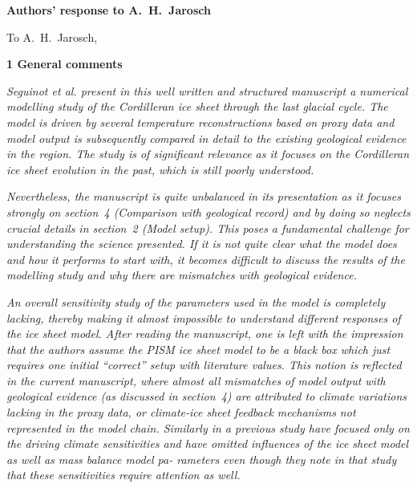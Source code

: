 \documentclass[10pt]{article}
\begin{document}
\textbf{Authors' response to A.~H.~Jarosch}
\bigskip


\newcommand{\doi}[1]{doi:\allowbreak\href{http://dx.doi.org/#1}{#1}}
\newcommand{\sechead}[1]{\bigskip\noindent\textbf{#1}}
\newcommand{\referee}[1]{\bigskip\textcolor{journalname}{\textit{#1}}}
\newcommand{\msquote}[1]{\begin{quote}\textit{#1}\end{quote}}
\newcommand{\todo}[1]{\textcolor{red}{TODO: #1}}

To A.~H.~Jarosch,


\sechead{1 \quad General comments}

\referee{%
    Seguinot et al. present in this well written and structured manuscript a
    numerical modelling study of the Cordilleran ice sheet through the last
    glacial cycle. The model is driven by several temperature reconstructions
    based on proxy data and model output is subsequently compared in detail to
    the existing geological evidence in the region. The study is of significant
    relevance as it focuses on the Cordilleran ice sheet evolution in the past,
    which is still poorly understood.}

\referee{%
    Nevertheless, the manuscript is quite unbalanced in its presentation as it
    focuses strongly on section~4 (Comparison with geological record) and by
    doing so neglects crucial details in section~2 (Model setup). This poses a
    fundamental challenge for understanding the science presented. If it is not
    quite clear what the model does and how it performs to start with, it
    becomes difficult to discuss the results of the modelling study and why
    there are mismatches with geological evidence.}

\referee{%
    An overall sensitivity study of the parameters used in the model is
    completely lacking, thereby making it almost impossible to understand
    different responses of the ice sheet model. After reading the manuscript,
    one is left with the impression that the authors assume the PISM ice sheet
    model to be a black box which just requires one initial ``correct'' setup
    with literature values. This notion is reflected in the current manuscript,
    where almost all mismatches of model output with geological evidence (as
    discussed in section~4) are attributed to climate variations lacking in the
    proxy data, or climate-ice sheet feedback mechanisms not represented in the
    model chain. Similarly in a previous study \citet{Seguinot.etal.2014} have
    focused only on the driving climate sensitivities and have omitted
    influences of the ice sheet model as well as mass balance model pa-
    rameters even though they note in that study that these sensitivities
    require attention as well.}
\end{document}

